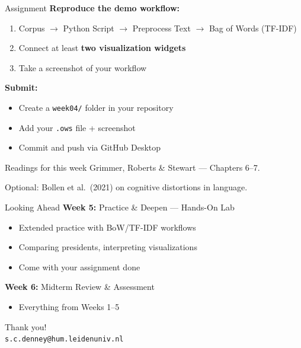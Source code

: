 \documentclass[aspectratio=169,11pt]{beamer}
\begin{document}
\begin{frame}{Assignment}
    \textbf{Reproduce the demo workflow:}

    \vspace{0.2cm}

    \begin{enumerate}
        \item Corpus $\rightarrow$ Python Script $\rightarrow$ Preprocess Text $\rightarrow$ Bag of Words (TF-IDF)
        \item Connect at least \textbf{two visualization widgets}
        \item Take a screenshot of your workflow
    \end{enumerate}

    \vspace{0.3cm}

    \textbf{Submit:}
    \begin{itemize}
        \item Create a \texttt{week04/} folder in your repository
        \item Add your \texttt{.ows} file + screenshot
        \item Commit and push via GitHub Desktop
    \end{itemize}

    \vspace{0.4cm}

    \begin{block}{Readings for this week}
        Grimmer, Roberts \& Stewart --- Chapters 6--7.

        Optional: Bollen et al.\ (2021) on cognitive distortions in language.
    \end{block}
\end{frame}

\begin{frame}{Looking Ahead}
    \textbf{Week 5:} Practice \& Deepen --- Hands-On Lab
    \begin{itemize}
        \item Extended practice with BoW/TF-IDF workflows
        \item Comparing presidents, interpreting visualizations
        \item Come with your assignment done
    \end{itemize}

    \vspace{0.3cm}

    \textbf{Week 6:} Midterm Review \& Assessment
    \begin{itemize}
        \item Everything from Weeks 1--5
    \end{itemize}

    \vspace{0.5cm}

    \begin{center}
        {\Large Thank you!}\\[0.3cm]
        \normalsize\texttt{s.c.denney@hum.leidenuniv.nl}
    \end{center}
\end{frame}
\end{document}
